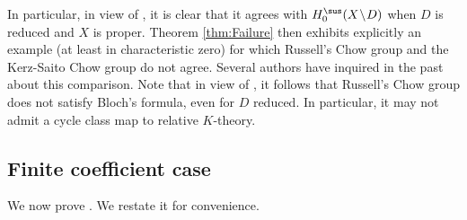 In particular, in view of , it is clear that it agrees with \hbox{$H_0^{\sus}(X\!\setminus\!D)$} when $D$ is reduced and $X$ is proper. Theorem \ref{thm:Failure} then exhibits explicitly an example
(at least in characteristic zero)
for which Russell's Chow group and the Kerz-Saito Chow group do not agree.
Several authors have inquired in the past about this comparison.
Note that in view of \cite[Th.\,1.1]{BKS}, it follows that Russell's Chow group does not satisfy Bloch's formula, even for $D$ reduced. In particular,
it may not admit a cycle class map to relative $K$-theory.

\subsection{Finite coefficient case}\label{sec:Main2-III}
We now prove . We restate it for convenience.

